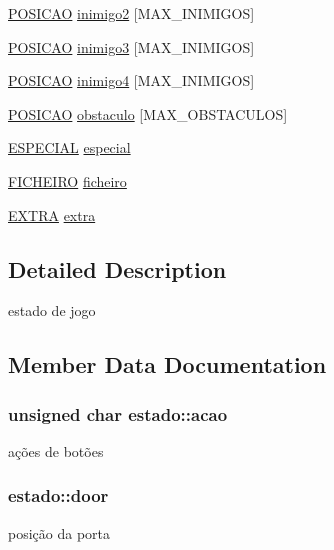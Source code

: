 \begin{DoxyCompactItemize}
\item 
\hyperlink{structposicao}{P\+O\+S\+I\+C\+AO} \hyperlink{structestado_a839ea6e060baabcda201827aa29d0c43}{inimigo2} \mbox{[}M\+A\+X\+\_\+\+I\+N\+I\+M\+I\+G\+OS\mbox{]}
\item 
\hyperlink{structposicao}{P\+O\+S\+I\+C\+AO} \hyperlink{structestado_affd195b1ac844359ae7c68fdce7efe5e}{inimigo3} \mbox{[}M\+A\+X\+\_\+\+I\+N\+I\+M\+I\+G\+OS\mbox{]}
\item 
\hyperlink{structposicao}{P\+O\+S\+I\+C\+AO} \hyperlink{structestado_ad2ab0aed08f6293af662f4978f7a27b5}{inimigo4} \mbox{[}M\+A\+X\+\_\+\+I\+N\+I\+M\+I\+G\+OS\mbox{]}
\item 
\hyperlink{structposicao}{P\+O\+S\+I\+C\+AO} \hyperlink{structestado_a970dc20c6687acb17c3f08c06edbed4f}{obstaculo} \mbox{[}M\+A\+X\+\_\+\+O\+B\+S\+T\+A\+C\+U\+L\+OS\mbox{]}
\item 
\hyperlink{structespecial}{E\+S\+P\+E\+C\+I\+AL} \hyperlink{structestado_a8e5a5819f7960d012d2fa24bfd730f8d}{especial}
\item 
\hyperlink{structficheiro}{F\+I\+C\+H\+E\+I\+RO} \hyperlink{structestado_a922e9490fa436556fe619dad6cd50113}{ficheiro}
\item 
\hyperlink{structextra}{E\+X\+T\+RA} \hyperlink{structestado_ac30377d2bf33d24a086af42770b858c8}{extra}
\end{DoxyCompactItemize}


\subsection{Detailed Description}
estado de jogo 

\subsection{Member Data Documentation}
\subsubsection[{\texorpdfstring{acao}{acao}}]{\setlength{\rightskip}{0pt plus 5cm}unsigned char estado\+::acao}\hypertarget{structestado_a239f415b0cc18d6ba0f71d49e0ff9580}{}\label{structestado_a239f415b0cc18d6ba0f71d49e0ff9580}
ações de botões 
\subsubsection[{\texorpdfstring{door}{door}}]{ estado\+::door}\hypertarget{structestado_a7415ebf0dc1fbc535407bb2bd669dc81}{}\label{structestado_a7415ebf0dc1fbc535407bb2bd669dc81}
posição da porta 
